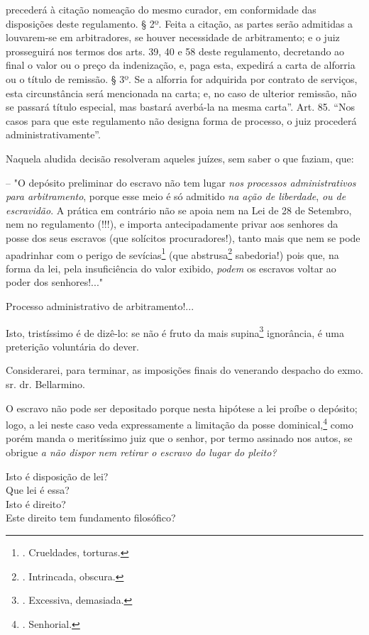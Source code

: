 {  precederá à citação nomeação do mesmo curador, em conformidade das
  disposições deste regulamento. § 2º. Feita a citação, as partes serão
  admitidas a louvarem-se em arbitradores, se houver necessidade de
  arbitramento; e o juiz prosseguirá nos termos dos arts. 39, 40 e 58
  deste regulamento, decretando ao final o valor ou o preço da
  indenização, e, paga esta, expedirá a carta de alforria ou o título de
  remissão. § 3º. Se a alforria for adquirida por contrato de serviços,
  esta circunstância será mencionada na carta; e, no caso de ulterior
  remissão, não se passará título especial, mas bastará averbá-la na
  mesma carta''. Art. 85. ``Nos casos para que este regulamento não
  designa forma de processo, o juiz procederá administrativamente''.}

Naquela aludida decisão resolveram aqueles juízes, sem saber o que
faziam, que:

-- "O depósito preliminar do escravo não tem lugar \emph{nos processos
administrativos para arbitramento}, porque esse meio é só admitido
\emph{na ação de liberdade}, \emph{ou de escravidão}. A prática em
contrário não se apoia nem na Lei de 28 de Setembro, nem no regulamento
(!!!), e importa antecipadamente privar aos senhores da posse dos seus
escravos (que solícitos procuradores!), tanto mais que nem se pode
apadrinhar com o perigo de sevícias\footnote{. Crueldades, torturas.}
(que abstrusa\footnote{. Intrincada, obscura.} sabedoria!) pois que, na
forma da lei, pela insuficiência do valor exibido, \emph{podem} os
escravos voltar ao poder dos senhores!..."

Processo administrativo de arbitramento!...

Isto, tristíssimo é de dizê-lo: se não é fruto da mais supina\footnote{.
  Excessiva, demasiada.} ignorância, é uma preterição voluntária do
dever.

Considerarei, para terminar, as imposições finais do venerando despacho
do exmo. sr. dr. Bellarmino.

O escravo não pode ser depositado porque nesta hipótese a lei proíbe o
depósito; logo, a lei neste caso veda expressamente a limitação da posse
dominical,\footnote{. Senhorial.} como porém manda o meritíssimo juiz
que o senhor, por termo assinado nos autos, se obrigue \emph{a não
dispor} \emph{nem retirar o escravo do lugar do pleito? }

Isto é disposição de lei?\\
Que lei é essa?\\
Isto é direito?\\
Este direito tem fundamento filosófico?

